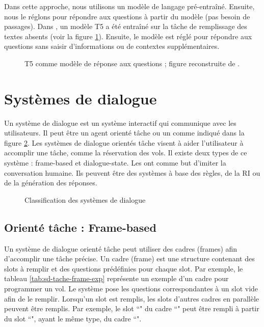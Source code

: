 \documentclass{KodeBook}
\begin{document}
Dans cette approche, nous utilisons un modèle de langage pré-entraîné. 
Ensuite, nous le réglons pour répondre aux questions à partir du modèle (pas besoin de passages). 
Dans \cite{2020-roberts-al}, un modèle T5 a été entraîné  sur la tâche de remplissage des textes absents (voir la figure \ref{fig:qr-modele-t5}).
Ensuite, le modèle est réglé pour répondre aux questions sans saisir d'informations ou de contextes supplémentaires.

\begin{figure}[ht]
	\centering
	\caption[T5 comme modèle de réponse aux questions.]{T5 comme modèle de réponse aux questions ; figure reconstruite de \cite{2020-roberts-al}.}
	\label{fig:qr-modele-t5}
\end{figure}

\section{Systèmes de dialogue}

Un système de dialogue est un système interactif qui communique avec les utilisateurs. 
Il peut être un agent orienté tâche ou un  comme indiqué dans la figure \ref{fig:sd-classif}. 
Les systèmes de dialogue orientés tâche visent à aider l'utilisateur à accomplir une tâche, comme la réservation des vols. 
Il existe deux types de ce système : frame-based et dialogue-state. 
Les  ont comme but d'imiter la conversation humaine.
Ils peuvent être des systèmes à base des règles, de la RI ou de la génération des réponses.

\begin{figure}[!ht]
	\centering
	\caption{Classification des systèmes de dialogue}
	\label{fig:sd-classif}
\end{figure}


\subsection{Orienté tâche : Frame-based}

Un système de dialogue orienté tâche peut utiliser des cadres (frames) afin d'accomplir une tâche précise. 
Un cadre (frame) est une structure contenant des slots à remplir et des questions prédéfinies pour chaque slot.
Par exemple, le tableau \ref{tab:sd-tache-frame-exp} représente un exemple d'un cadre pour programmer un vol.
Le système pose les questions correspondantes à un slot vide afin de le remplir.
Lorsqu'un slot est remplis, les slots d'autres cadres en parallèle peuvent être remplis. 
Par exemple, le slot ``" du cadre ``" peut être rempli à partir du slot ``", ayant le même type, du cadre ``".
\end{document}
